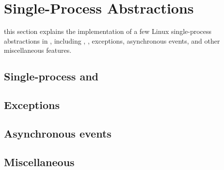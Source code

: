 \section{Single-Process Abstractions}

this section explains the implementation
of a few Linux single-process abstractions in \thelibos{}, including , , exceptions, asynchronous events, and other miscellaneous features.


\subsection{Single-process  and }






\subsection{Exceptions}





\subsection{Asynchronous events}






\subsection{Miscellaneous}



